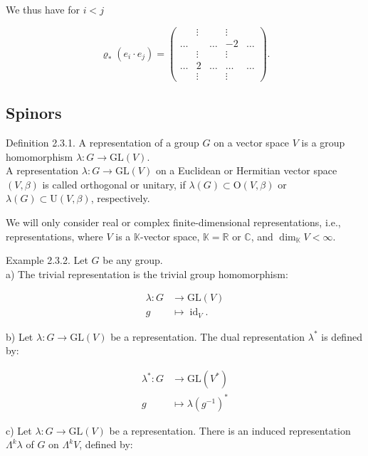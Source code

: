 \documentclass[10pt, letterpaper]{article}
\begin{document}
We thus have for $i<j$

$$
\varrho_{*}\left(e_{i} \cdot e_{j}\right)=\left(\begin{array}{ccccc} 
& \vdots & & \vdots & \\
\ldots & & \ldots & -2 & \ldots \\
& \vdots & & \vdots & \\
\ldots & 2 & \ldots & \ldots & \ldots \\
& \vdots & & \vdots &
\end{array}\right) .
$$

\subsection{Spinors}
Definition 2.3.1. A representation of a group $G$ on a vector space $V$ is a group homomorphism $\lambda: G \rightarrow \mathrm{GL}(V)$.\\
A representation $\lambda: G \rightarrow \mathrm{GL}(V)$ on a Euclidean or Hermitian vector space $(V, \beta)$ is called orthogonal or unitary, if $\lambda(G) \subset \mathrm{O}(V, \beta)$ or $\lambda(G) \subset \mathrm{U}(V, \beta)$, respectively.

We will only consider real or complex finite-dimensional representations, i.e., representations, where $V$ is a $\mathbb{K}$-vector space, $\mathbb{K}=\mathbb{R}$ or $\mathbb{C}$, and $\operatorname{dim}_{\mathbb{K}} V<\infty$.

Example 2.3.2. Let $G$ be any group.\\
a) The trivial representation is the trivial group homomorphism:

$$
\begin{aligned}
\lambda: G & \rightarrow \mathrm{GL}(V) \\
g & \mapsto \operatorname{id}_{V} .
\end{aligned}
$$

b) Let $\lambda: G \rightarrow \mathrm{GL}(V)$ be a representation. The dual representation $\lambda^{*}$ is defined by:

$$
\begin{aligned}
\lambda^{*}: G & \rightarrow \mathrm{GL}\left(V^{*}\right) \\
g & \mapsto \lambda\left(g^{-1}\right)^{*}
\end{aligned}
$$

c) Let $\lambda: G \rightarrow \mathrm{GL}(V)$ be a representation. There is an induced representation $\Lambda^{k} \lambda$ of $G$ on $\Lambda^{k} V$, defined by:
\end{document}
